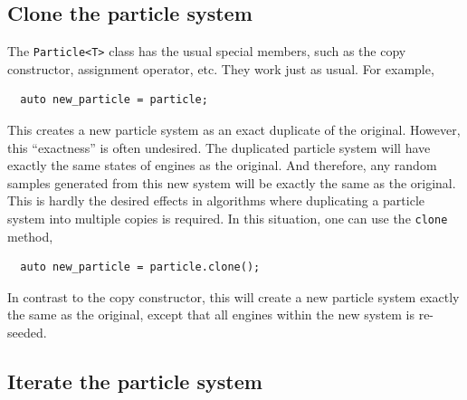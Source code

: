 \subsection{Clone the particle system}
\label{sub:Clone the particle system}

The \verb|Particle<T>| class has the usual special members, such as the copy
constructor, assignment operator, etc. They work just as usual. For example,
\begin{Verbatim}
  auto new_particle = particle;
\end{Verbatim}
This creates a new particle system as an exact duplicate of the original.
However, this ``exactness'' is often undesired. The duplicated particle system
will have exactly the same states of \rng engines as the original. And
therefore, any random samples generated from this new system will be exactly
the same as the original. This is hardly the desired effects in algorithms
where duplicating a particle system into multiple copies is required. In this
situation, one can use the \verb|clone| method,
\begin{Verbatim}
  auto new_particle = particle.clone();
\end{Verbatim}
In contrast to the copy constructor, this will create a new particle system
exactly the same as the original, except that all \rng engines within the new
system is re-seeded.

\subsection{Iterate the particle system}
\label{sub:Iterate the particle system}

